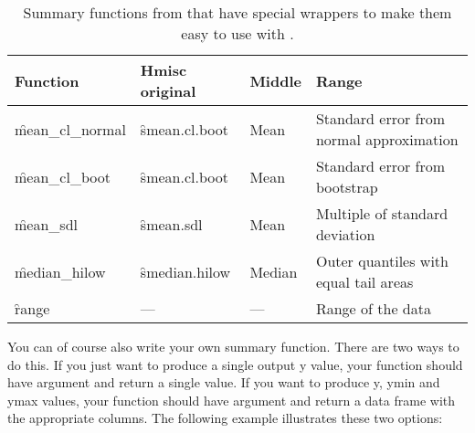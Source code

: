 % 


\begin{table}
  \begin{center}
  \begin{tabular}{lllp{2in}}
    \toprule
    Function & Hmisc original & Middle & Range \\
    \midrule 
    \f{mean_cl_normal} & \f{smean.cl.boot} & 
      Mean & Standard error from normal approximation \\
    \f{mean_cl_boot} & \f{smean.cl.boot} & 
      Mean & Standard error from bootstrap \\
    \f{mean_sdl} & \f{smean.sdl} & 
      Mean & Multiple of standard deviation  \\
    \f{median_hilow} & \f{smedian.hilow}  & 
      Median & Outer quantiles with equal tail areas \\
    \f{range} & --- & 
      --- & Range of the data\\
    \bottomrule
  \end{tabular}
  \end{center}
  \caption{Summary functions from  that have special wrappers to make them easy to use with .}
  \label{tbl:hmisc}
\end{table}

You can of course also write your own summary function.  There are two ways to do this.  If you just want to produce a single output y value, your function should have argument  and return a single value.  If you want to produce y, ymin and ymax values, your function should have argument  and return a data frame with the appropriate columns.  The following example illustrates these two options:

